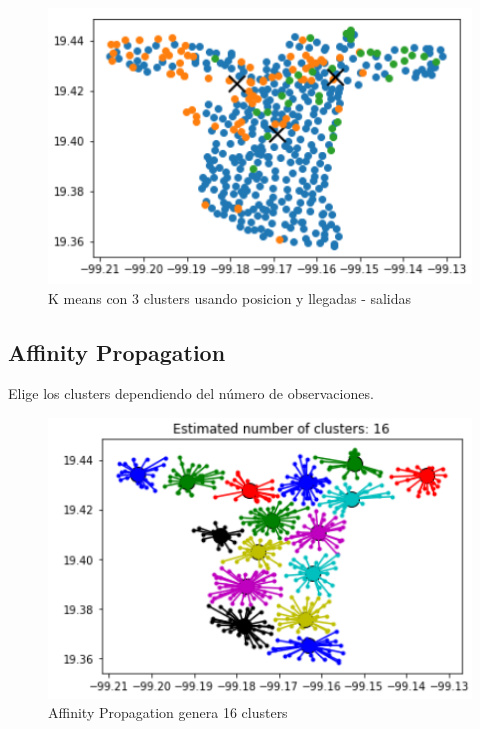 \documentclass[12pt,spanish]{article}
\begin{document}
	\begin{figure}[H]
		\centering
		\includegraphics[width=15cm]{Imagenes/kmeans_3.png}
		\begin{centering}
			\caption{K means con 3 clusters usando posicion y llegadas - salidas}
		\end{centering}
	\end{figure}
	\subsection{Affinity Propagation}
	Elige los clusters dependiendo del número de observaciones.
	\begin{figure}[H]
		\centering
		\includegraphics[width=15cm]{Imagenes/ap_16.png}
		\begin{centering}
			\caption{Affinity Propagation genera 16 clusters}
		\end{centering}
	\end{figure}
	\newpage
\end{document}
